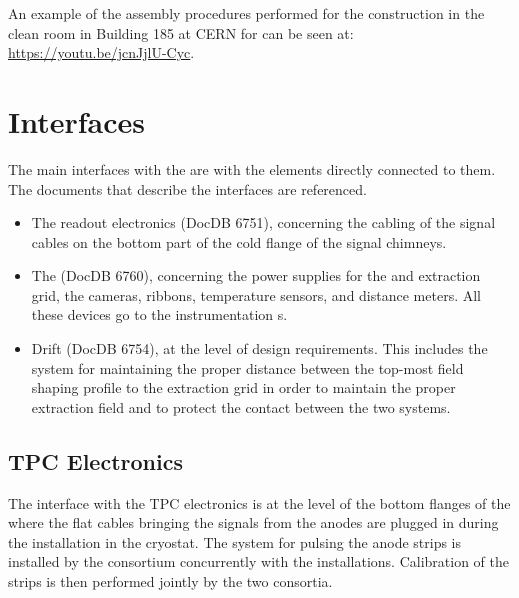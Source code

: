 An example of the assembly procedures performed for the   construction in the clean room in Building 185 at CERN for  can be seen at: \url{https://youtu.be/jcnJjlU-Cyc}.


\section{Interfaces}
\label{sec:fddp-crp-intfc}

The main interfaces with the  are with the elements directly connected to them. The documents that describe the interfaces are referenced.
\begin{itemize}
\item The readout electronics  (DocDB 6751), concerning the cabling of the signal cables on the bottom part of the cold 
flange of the signal chimneys.  
\item The  (DocDB 6760),  concerning the power supplies for the  and extraction grid, the cameras,  ribbons, temperature sensors, and distance meters. All these devices go to the  instrumentation \fdth{}s. 

\item Drift  (DocDB 6754), at the level of design requirements. This includes the system for maintaining the proper distance between the top-most field shaping profile to the extraction grid in order to maintain the proper extraction field and to protect the contact between the two systems.
\end{itemize}

\subsection{TPC Electronics}
\label{sec:fddp-crp-intfc-elec}

The interface with the \dual TPC electronics is at the level of the bottom flanges of the  where the flat cables bringing the signals from the anodes are plugged in during the  installation in the cryostat. The system for %
pulsing the anode strips is installed by the  consortium %
concurrently with the  installations. %
Calibration of the strips is then performed jointly by the two consortia.


